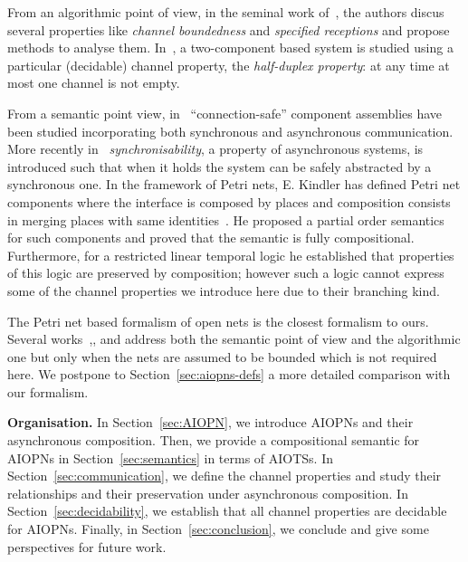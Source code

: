 From an algorithmic point of view,
in the seminal work of~\cite{Brand:1983:CFM:322374.322380}, the authors discus several properties
like \emph{channel boundedness} and \emph{specified receptions} and propose
methods to analyse them. In~\cite{Cece:2005:VPH:1124524.1709549}, a two-component based
system is studied using a particular (decidable) channel property,
the \emph{half-duplex property}: at any time at most one channel
is not empty. 


From a semantic point view, in~\cite{hennicker2010} 
``connection-safe'' component 
assemblies have been studied incorporating both synchronous and asynchronous communication.
More recently in~\cite{BTO12} \emph{synchronisability},
a property of asynchronous systems, is introduced such that when it holds
the system can be safely abstracted by a synchronous one.
In the framework of Petri nets, E. Kindler has defined Petri net components
where the interface is composed by places and  composition consists in
merging places with same identities~\cite{Kindler97}. He proposed a
partial order semantics for such components and proved that the semantic
is fully compositional. Furthermore, for a restricted linear temporal logic
he established that properties of this logic are preserved by composition;
however such a logic cannot express some of the channel properties
we introduce here due to their branching kind.

The Petri net based formalism of open nets  is the closest formalism to ours.
Several works~\cite{Lohmann07},\cite{DK2009}, and \cite{Stahl12} address both the semantic point of view 
and the algorithmic one but only when the nets are assumed to be bounded which is not required
here. We postpone to Section~\ref{sec:aiopns-defs} a more detailed comparison with our formalism.

\noindent
{\bf Organisation.}
In Section~\ref{sec:AIOPN}, we introduce AIOPNs and their asynchronous composition.
Then, we provide a compositional semantic for AIOPNs in Section~\ref{sec:semantics} 
in terms of AIOTSs.
In Section~\ref{sec:communication}, we define the channel properties
and study their relationships and their preservation under asynchronous composition.
In Section~\ref{sec:decidability}, we establish that all channel properties
are decidable for AIOPNs. Finally, in Section~\ref{sec:conclusion}, we conclude and give some
perspectives for future work.